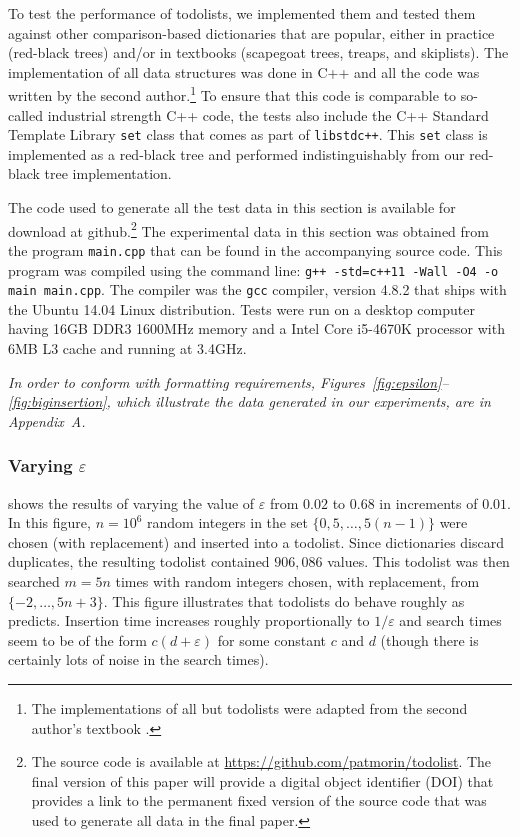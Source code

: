 \documentclass{patmorin}
\newcommand{\eps}{\varepsilon}
\begin{document}
To test the performance of todolists, we implemented them and tested them
against other comparison-based dictionaries that are popular, either in
practice (red-black trees) and/or in textbooks (scapegoat trees, treaps,
and skiplists).  The implementation of all data structures was done in
C++ and all the code was written by the second author.\footnote{The
implementations of all but todolists were adapted from the second
author's textbook \cite{morin:open}.}  To ensure that this code is
comparable to so-called industrial strength C++ code, the tests also
include the C++ Standard Template Library \texttt{set} class that comes
as part of \texttt{libstdc++}.  This \texttt{set} class is implemented
as a red-black tree and performed indistinguishably from our red-black
tree implementation.

The code used to generate all the test data in this section is available
for download at github.\footnote{The source code is available at
\url{https://github.com/patmorin/todolist}. The final version of this
paper will provide a digital object identifier (DOI) that provides a
link to the permanent fixed version of the source code that was used to
generate all data in the final paper.}
The experimental data in this section was obtained from the program
\texttt{main.cpp} that can be found in the accompanying source code.
This program was compiled using the command line: \texttt{g++ -std=c++11 -Wall -O4 -o main main.cpp}. The compiler was the \texttt{gcc} compiler, version
4.8.2 that ships with the Ubuntu 14.04 Linux distribution.  Tests were
run on a desktop computer having 16GB DDR3 1600MHz memory and a Intel
Core i5-4670K processor with 6MB L3 cache and running at 3.4GHz.

\emph{In order to conform with formatting requirements, Figures~\ref{fig:epsilon}--\ref{fig:biginsertion}, which illustrate the data generated in our experiments, are in Appendix~A.}

\subsubsection{Varying $\eps$}

 shows the results of varying the value of $\eps$ from
$0.02$ to $0.68$ in increments of $0.01$. In this figure, $n=10^6$
random integers in the set $\{0, 5,\ldots,5(n-1)\}$ were chosen
(with replacement) and inserted into a todolist. Since dictionaries
discard duplicates, the resulting todolist contained $906,086$ values.
This todolist was then searched $m=5n$ times with random integers chosen,
with replacement, from $\{-2,\ldots,5n+3\}$.  This figure illustrates
that todolists do behave roughly as  predicts.
Insertion time increases roughly proportionally to $1/\eps$ and search
times seem to be of the form $c(d+\eps)$ for some constant $c$ and $d$
(though there is certainly lots of noise in the search times).
\end{document}
